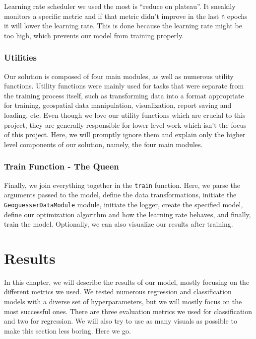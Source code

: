 \documentclass[]{article}
\let\oldtexttt\texttt
\renewcommand{\texttt}[1]{
  \textcolor{tcolor}{\colorbox{bgcolor}{\oldtexttt{#1}}}
}
\begin{document}
Learning rate scheduler we used the most is ``reduce on plateau''. It
sneakily monitors a specific metric and if that metric didn't improve in
the last \texttt{n} epochs it will lower the learning rate. This is done
because the learning rate might be too high, which prevents our model
from training properly.

\hypertarget{utilities}{%
\subsubsection{Utilities}\label{utilities}}

Our solution is composed of four main modules, as well as numerous
utility functions. Utility functions were mainly used for tasks that
were separate from the training process itself, such as transforming
data into a format appropriate for training, geospatial data
manipulation, visualization, report saving and loading, etc. Even though
we love our utility functions which are crucial to this project, they
are generally responsible for lower level work which isn't the focus of
this project. Here, we will promptly ignore them and explain only the
higher level components of our solution, namely, the four main modules.

\hypertarget{train-function---the-queen}{%
\subsubsection{Train Function - The
Queen}\label{train-function---the-queen}}

Finally, we join everything together in the \texttt{train} function.
Here, we parse the arguments passed to the model, define the data
transformations, initiate the \texttt{GeoguesserDataModule} module,
initiate the logger, create the specified model, define our optimization
algorithm and how the learning rate behaves, and finally, train the
model. Optionally, we can also visualize our results after training.

\hypertarget{results}{%
\section{Results}\label{results}}

In this chapter, we will describe the results of our model, mostly
focusing on the different metrics we used. We tested numerous regression
and classification models with a diverse set of hyperparameters, but we
will mostly focus on the most successful ones. There are three
evaluation metrics we used for classification and two for regression. We
will also try to use as many visuals as possible to make this section
less boring. Here we go.
\end{document}
